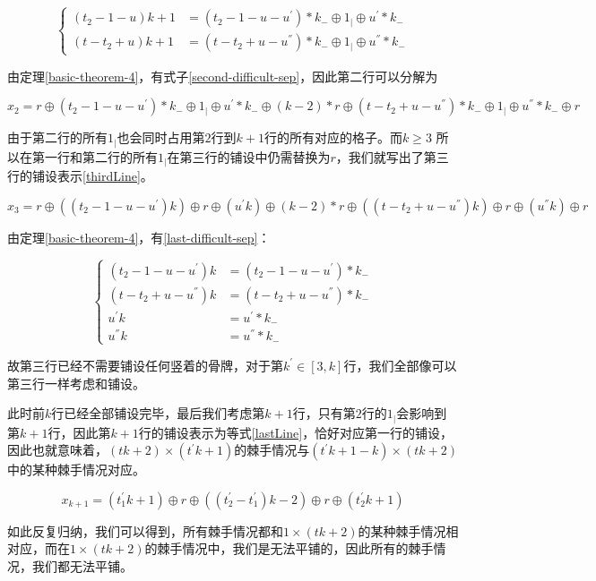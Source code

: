 \begin{equation}
    \left\{
    \begin{aligned}
        (t_2 - 1 - u)k + 1 & = (t_2 - 1 - u - u^{'}) * k_{-} \oplus 1_{\vert} \oplus u^{'} *  k_{-}     \\
        (t - t_2 + u)k + 1 & = (t - t_2 + u - u^{''}) *  k_{-} \oplus 1_{\vert} \oplus  u^{''} *  k_{-}
    \end{aligned}
    \right.
    \label{second-difficult-sep}
\end{equation}

由定理\ref*{basic-theorem-4}，有式子\ref*{second-difficult-sep}，因此第二行可以分解为

$x_2 =  r \oplus  (t_2- 1 - u - u^{'}) * k_{-} \oplus 1_{\vert} \oplus  u^{'} * k_{-}  \oplus (k - 2) * r \oplus
    (t - t_2 + u - u^{''}) * k_{-} \oplus 1_{\vert} \oplus  u^{''} * k_{-} \oplus r$

由于第二行的所有$1_{\vert}$也会同时占用第$2$行到$k + 1$行的所有对应的格子。而$k \ge 3$ 所以在第一行和第二行的所有$1_{\vert}$在第三行的铺设中仍需替换为$r$，我们就写出了第三行的铺设表示\ref{thirdLine}。

\begin{equation}
    x_3 =  r \oplus  ((t_2- 1 - u - u^{'})k) \oplus r \oplus  (u^{'}k) \oplus (k - 2) * r \oplus
    ((t - t_2 + u - u^{''})k) \oplus r \oplus  (u^{''}k) \oplus r
    \label{thirdLine}
\end{equation}

由定理\ref*{basic-theorem-4}，有\ref*{last-difficult-sep}：

\begin{equation}
    \left\{
    \begin{aligned}
        (t_2 - 1 - u - u^{'})k  & = (t_2- 1 - u - u^{'}) * k_{-}   \\
        (t - t_2 + u - u^{''})k & = (t - t_2 + u - u^{''}) * k_{-} \\
        u^{'}k                  & = u^{'} * k_{-}                  \\
        u^{''}k                 & = u^{''} * k_{-}
    \end{aligned}
    \right.
    \label{last-difficult-sep}
\end{equation}

故第三行已经不需要铺设任何竖着的骨牌，对于第$k^{'}\in [3, k]$行，我们全部像可以第三行一样考虑和铺设。

此时前$k$行已经全部铺设完毕，最后我们考虑第$k + 1$行，只有第$2$行的$1_{\vert}$会影响到第$k+1$行，因此第$k+1$行的铺设表示为等式\ref{lastLine}，恰好对应第一行的铺设，因此也就意味着，$(tk + 2) \times (t^{'}k + 1)$的棘手情况与$(t^{'}k + 1 - k) \times (tk + 2)$中的某种棘手情况对应。

\begin{equation}
    x_{k+1} =  (t^{'}_1k + 1) \oplus r \oplus  ((t^{'}_2 - t^{'}_1)k - 2) \oplus r \oplus  (t^{'}_2k + 1)
    \label{lastLine}
\end{equation}

如此反复归纳，我们可以得到，所有棘手情况都和$1 \times (tk + 2)$的某种棘手情况相对应，而在$1 \times (tk + 2)$的棘手情况中，我们是无法平铺的，因此所有的棘手情况，我们都无法平铺。

\clearpage